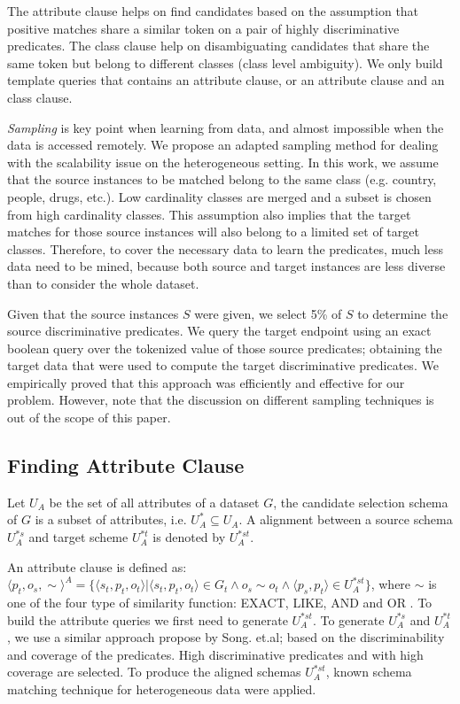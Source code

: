 The attribute clause helps on find candidates based on the assumption that positive matches share a similar token on a pair of highly discriminative predicates. The class clause help on disambiguating candidates that share the same token but belong to different classes (class level ambiguity).  We only build template queries that contains an attribute clause, or an attribute clause and an class clause. 


\emph{Sampling} is key point when learning from data, and almost impossible when the data is accessed remotely. We propose an adapted sampling method for dealing with the scalability issue on the heterogeneous setting. In this work, we assume that the source instances to be matched belong to the same class (e.g. country, people, drugs, etc.). Low cardinality classes are merged and a subset is chosen from high cardinality classes. This assumption also implies that the target matches for those source instances will also belong to a limited set of target classes. Therefore, to cover the necessary data to learn the predicates, much less data need to be mined, because both source and target instances are less diverse than to consider the whole dataset.

Given that the source instances $S$ were given, we select 5\% of $S$ to determine the source discriminative predicates. We query the target endpoint using an exact boolean query over the tokenized value of those source predicates; obtaining the target data that were used to compute the target discriminative predicates. We empirically proved that this approach was efficiently and effective for our problem. However, note that the discussion on different sampling techniques is out of the scope of this paper.

\subsection{Finding Attribute Clause}

Let $U_A$ be the set of all attributes of a dataset $G$, the candidate selection schema of $G$ is a subset of attributes, i.e. $U^*_A  \subseteq U_A$.  A alignment between a source schema $U^{*s}_A$ and target scheme $U^{*t}_A$ is denoted by $U^{*st}_A$.

An attribute clause is defined as: $\langle p_t,o_s,\sim \rangle^A=\{\langle s_t,p_t,o_t \rangle | \langle s_t,p_t,o_t \rangle \in G_t \land o_s\sim o_t \land \langle p_s, p_t \rangle \in U^{*st}_A\}$, where $\sim$ is one of the four type of similarity function: EXACT, LIKE, AND and  OR . To build the attribute queries we first need to generate $U^{*st}_A$. To generate $U^{*s}_A$ and $U^{*t}_A$, we use a similar approach propose by Song. et.al; based on the discriminability and coverage of the predicates. High discriminative predicates and with high coverage are selected. To produce the aligned schemas $U^{*st}_A$, known schema matching technique for heterogeneous data were applied.  

